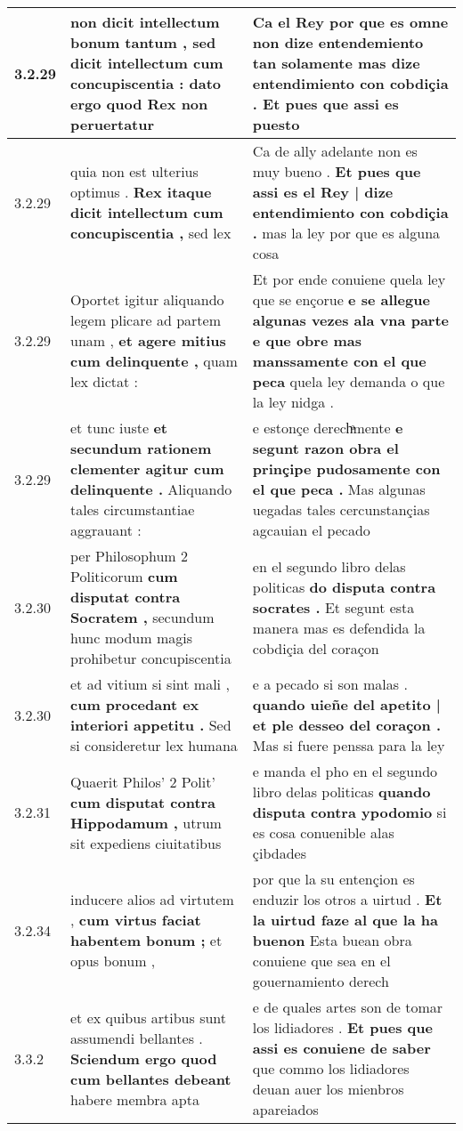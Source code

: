 \begin{tabular}{|p{1cm}|p{6.5cm}|p{6.5cm}|}
3.2.29 & non dicit intellectum bonum tantum , \textbf{ sed dicit intellectum cum concupiscentia : } dato ergo quod Rex non peruertatur & Ca el Rey por que es omne \textbf{ non dize entendemiento tan solamente mas dize entendimiento con cobdiçia . } Et pues que assi es puesto \\\hline
3.2.29 & quia non est ulterius optimus . \textbf{ Rex itaque dicit intellectum cum concupiscentia , } sed lex & Ca de ally adelante non es muy bueno . \textbf{ Et pues que assi es el Rey | dize entendimiento con cobdiçia . } mas la ley por que es alguna cosa \\\hline
3.2.29 & Oportet igitur aliquando legem plicare ad partem unam , \textbf{ et agere mitius cum delinquente , } quam lex dictat : & Et por ende conuiene quela ley que se ençorue \textbf{ e se allegue algunas vezes ala vna parte e que obre mas manssamente con el que peca } quela ley demanda o que la ley nidga . \\\hline
3.2.29 & et tunc iuste \textbf{ et secundum rationem clementer agitur cum delinquente . } Aliquando tales circumstantiae aggrauant : & e estonçe derechͣmente \textbf{ e segunt razon obra el prinçipe pudosamente con el que peca . } Mas algunas uegadas tales cercunstançias agcauian el pecado \\\hline
3.2.30 & per Philosophum 2 Politicorum \textbf{ cum disputat contra Socratem , } secundum hunc modum magis prohibetur concupiscentia & en el segundo libro delas politicas \textbf{ do disputa contra socrates . } Et segunt esta manera mas es defendida la cobdiçia del coraçon \\\hline
3.2.30 & et ad vitium si sint mali , \textbf{ cum procedant ex interiori appetitu . } Sed si consideretur lex humana & e a pecado si son malas . \textbf{ quando uieñe del apetito | et ple desseo del coraçon . } Mas si fuere penssa para la ley \\\hline
3.2.31 & Quaerit Philos’ 2 Polit’ \textbf{ cum disputat contra Hippodamum , } utrum sit expediens ciuitatibus & e manda el pho en el segundo libro delas politicas \textbf{ quando disputa contra ypodomio } si es cosa conuenible alas çibdades \\\hline
3.2.34 & inducere alios ad virtutem , \textbf{ cum virtus faciat habentem bonum ; } et opus bonum , & por que la su entençion es enduzir los otros a uirtud . \textbf{ Et la uirtud faze al que la ha buenon } Esta buean obra conuiene que sea en el gouernamiento derech \\\hline
3.3.2 & et ex quibus artibus sunt assumendi bellantes . \textbf{ Sciendum ergo quod cum bellantes debeant } habere membra apta & e de quales artes son de tomar los lidiadores . \textbf{ Et pues que assi es conuiene de saber } que commo los lidiadores deuan auer los mienbros apareiados \\\hline

\end{tabular}
